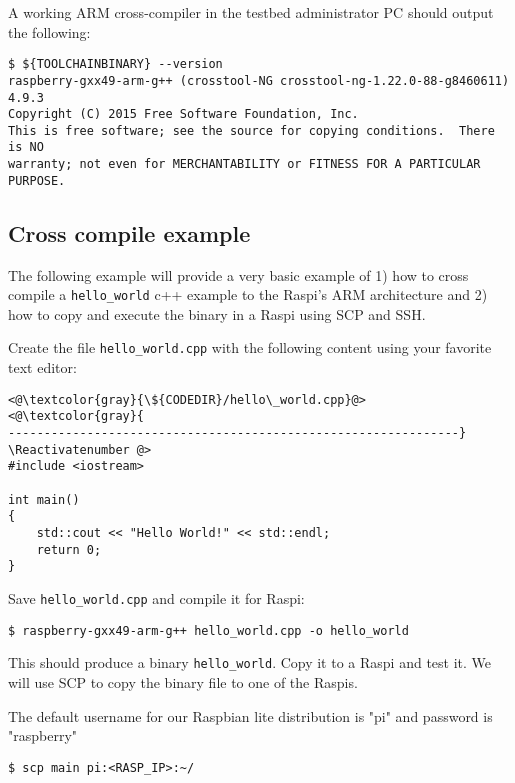 A working ARM cross-compiler in the testbed administrator \ac{PC} should
output the following:

\begin{lstlisting}[]
$ ${TOOLCHAINBINARY} --version
raspberry-gxx49-arm-g++ (crosstool-NG crosstool-ng-1.22.0-88-g8460611) 4.9.3
Copyright (C) 2015 Free Software Foundation, Inc.
This is free software; see the source for copying conditions.  There is NO
warranty; not even for MERCHANTABILITY or FITNESS FOR A PARTICULAR PURPOSE.
\end{lstlisting}
\FloatBarrier
\vspace{-5mm}

\subsection{Cross compile example}

The following example will provide a very basic example of 1) how to cross compile
a \texttt{hello\_world} c++ example to the \ac{Raspi}'s ARM architecture
and 2) how to copy and execute the binary in a \ac{Raspi} using \ac{SCP} and
\ac{SSH}.


Create the file \texttt{hello\_world.cpp} with the following content using your
favorite text editor:

\Suppressnumber\begin{lstlisting}[]
<@\textcolor{gray}{\${CODEDIR}/hello\_world.cpp}@>
<@\textcolor{gray}{
---------------------------------------------------------------}
\Reactivatenumber @>
#include <iostream>

int main()
{
    std::cout << "Hello World!" << std::endl;
    return 0;
}
\end{lstlisting}
\FloatBarrier

Save \texttt{hello\_world.cpp} and compile it for \ac{Raspi}:

\begin{lstlisting}[]
$ raspberry-gxx49-arm-g++ hello_world.cpp -o hello_world
\end{lstlisting}
\FloatBarrier
\vspace{-5mm}

This should produce a binary \texttt{hello\_world}. Copy it to a \ac{Raspi}
and test it. We will use \ac{SCP} to copy the binary file to one of the \ac{Raspi}s.

The default username for our Raspbian lite distribution is "pi" and password is "raspberry"

\begin{lstlisting}[]
$ scp main pi:<RASP_IP>:~/
\end{lstlisting}
\FloatBarrier
\vspace{-5mm}

